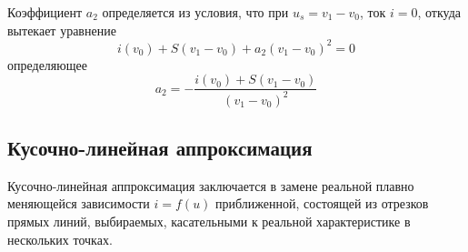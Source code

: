Коэффициент $a_2$ определяется из условия, что при $u_s=v_1-v_0$, ток $i=0$, откуда вытекает уравнение
\begin{equation*}
i(v_0)+S(v_1-v_0)+a_2(v_1-v_0)^2=0
\end{equation*}
определяющее
\begin{equation*}
a_2=-\frac{i(v_0)+S(v_1-v_0)}{(v_1-v_0)^2}
\end{equation*}
\subsection{Кусочно-линейная аппроксимация}
Кусочно-линейная аппроксимация заключается в замене реальной плавно меняющейся зависимости $i=f(u)$ приближенной, состоящей из отрезков прямых линий, выбираемых, касательными к реальной характеристике в нескольких точках.

